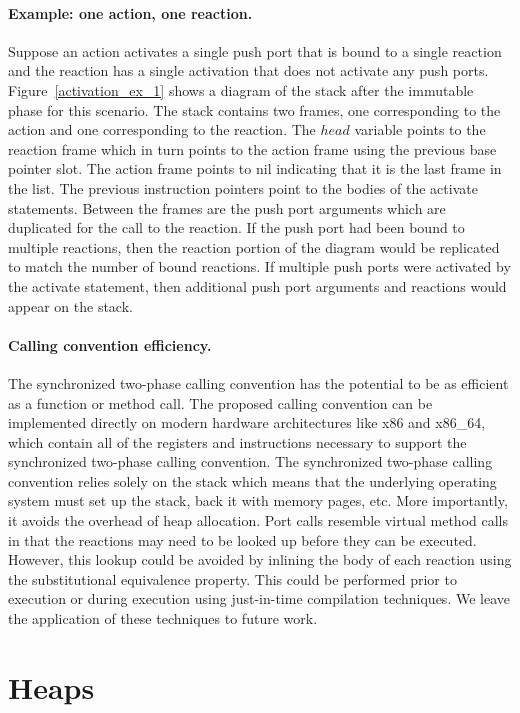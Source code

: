 \paragraph{Example:  one action, one reaction.}
Suppose an action activates a single push port that is bound to a single reaction and the reaction has a single activation that does not activate any push ports.
Figure~\ref{activation_ex_1} shows a diagram of the stack after the immutable phase for this scenario.
The stack contains two frames, one corresponding to the action and one corresponding to the reaction.
The $head$ variable points to the reaction frame which in turn points to the action frame using the previous base pointer slot.
The action frame points to nil indicating that it is the last frame in the list.
The previous instruction pointers point to the bodies of the activate statements.
Between the frames are the push port arguments which are duplicated for the call to the reaction.
If the push port had been bound to multiple reactions, then the reaction portion of the diagram would be replicated to match the number of bound reactions.
If multiple push ports were activated by the activate statement, then additional push port arguments and reactions would appear on the stack.

\paragraph{Calling convention efficiency.}
The synchronized two-phase calling convention has the potential to be as efficient as a function or method call.
The proposed calling convention can be implemented directly on modern hardware architectures like x86 and x86\_64, which contain all of the registers and instructions necessary to support the synchronized two-phase calling convention.
The synchronized two-phase calling convention relies solely on the stack which means that the underlying operating system must set up the stack, back it with memory pages, etc.
More importantly, it avoids the overhead of heap allocation.
Port calls resemble virtual method calls in that the reactions may need to be looked up before they can be executed.
However, this lookup could be avoided by inlining the body of each reaction using the substitutional equivalence property.
This could be performed prior to execution or during execution using just-in-time compilation techniques.
We leave the application of these techniques to future work.

\section{Heaps}
\label{heaps}


